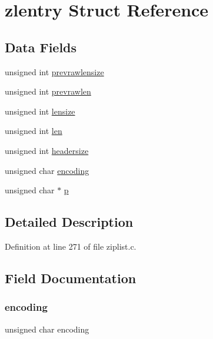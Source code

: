\hypertarget{structzlentry}{}\section{zlentry Struct Reference}
\label{structzlentry}
\subsection*{Data Fields}
\begin{DoxyCompactItemize}
\item 
unsigned int \hyperlink{structzlentry_a162d33e7ac8d8f59f126e3e5c3256c42}{prevrawlensize}
\item 
unsigned int \hyperlink{structzlentry_a1490cc0156cd544c2b683b7394006b8a}{prevrawlen}
\item 
unsigned int \hyperlink{structzlentry_ab779bf43e60fb94a44b8f80cc8b46860}{lensize}
\item 
unsigned int \hyperlink{structzlentry_a77124bd5f7e31e6fffc19f335da0c23f}{len}
\item 
unsigned int \hyperlink{structzlentry_a96f65a94d882ba054e92cc2c9300707c}{headersize}
\item 
unsigned char \hyperlink{structzlentry_aebb5bc6c2404c4a5dd3ab3a29b65422f}{encoding}
\item 
unsigned char $\ast$ \hyperlink{structzlentry_a4014c6f4a6fa0e565ca592bcaca0fa58}{p}
\end{DoxyCompactItemize}


\subsection{Detailed Description}


Definition at line 271 of file ziplist.\+c.



\subsection{Field Documentation}
\mbox{\label{structzlentry_aebb5bc6c2404c4a5dd3ab3a29b65422f}} 
\subsubsection{\texorpdfstring{encoding}{encoding}}
{\footnotesize\ttfamily unsigned char encoding}



